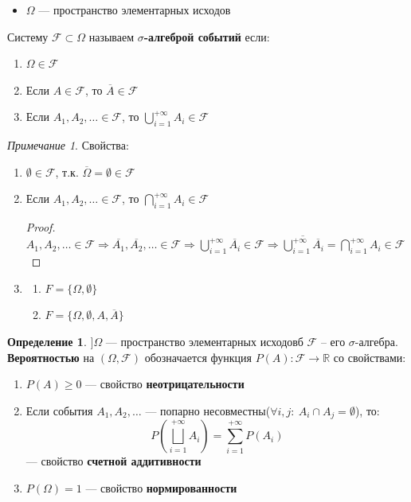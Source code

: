 \documentclass[oneside]{book}
\newcommand{\R}{\mathbb{R}}
\theoremstyle{plain}
\theoremstyle{remark}
\newtheorem*{remark}{Примечание}
\theoremstyle{definition}
\newtheorem*{definition}{Определение}
\begin{document}
\begin{itemize}
\item \(\Omega\) --- пространство элементарных исходов
\end{itemize}
\begin{deifinition}
Систему \(\mathcal{F} \subset \Omega\) называем \textbf{\(\sigma\)-алгеброй событий} если:
\begin{enumerate}
\item \(\Omega \in \mathcal{F}\)
\item Если \(A \in \mathcal{F}\), то \(\overline{A} \in \mathcal{F}\)
\item Если \(A_1, A_2, \dots \in \mathcal{F}\), то \(\bigcup_{i=1}^{+ \infty} A_i \in \mathcal{F}\)
\end{enumerate}
\end{deifinition}
\begin{remark}
Свойства:
\begin{enumerate}
\item \(\emptyset \in \mathcal{F}\), т.к. \(\overline{\Omega} = \emptyset \in \mathcal{F}\)
\item Если \(A_1, A_2, \dots \in \mathcal{F}\), то \(\bigcap_{i = 1}^{+ \infty} A_i \in \mathcal{F}\)
\begin{proof}
\-\\
\(A_1, A_2, \dots \in \mathcal{F} \Rightarrow \overline{A_1}, \overline{A_2}, \dots \in \mathcal{F} \Rightarrow \bigcup_{i = 1}^{+ \infty} \overline{A_i} \in \mathcal{F} \Rightarrow \overline{\bigcup_{i = 1}^{+ \infty}\overline{A_i}} = \bigcap_{i = 1}^{+ \infty} A_i \in \mathcal{F}\)
\end{proof}
\item \begin{enumerate}
\item \(F = \{\Omega, \emptyset\}\)
\item \(F = \{\Omega, \emptyset, A, \overline{A}\}\)
\end{enumerate}
\end{enumerate}
\end{remark}
\begin{definition}
\(] \Omega\) --- пространство элементарных исходовб \(\mathcal{F}\) -- его \(\sigma\)-алгебра.
\textbf{Вероятностью} на \((\Omega, \mathcal{F})\) обозначается функция \(P(A): \mathcal{F} \to \R\) со свойствами:
\begin{enumerate}
\item \(P(A) \ge 0\) --- свойство \textbf{неотрицательности}
\item Если события \(A_1, A_2, \dots\) --- попарно несовместны(\(\forall i,j:\ A_i \cap A_j = \emptyset\)),
то: \[ P(\bigsqcup_{i = 1}^{+ \infty} A_i) = \sum_{i = 1}^{+ \infty} P(A_i) \] --- свойство \textbf{счетной аддитивности}
\item \(P(\Omega) = 1\) --- свойство \textbf{нормированности}
\end{enumerate}
\end{definition}
\end{document}
